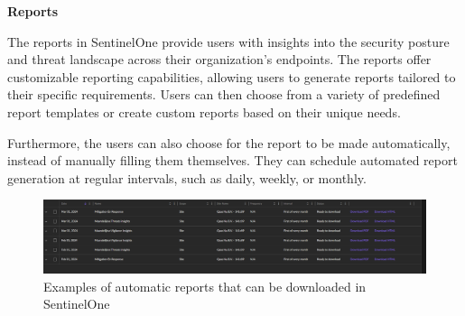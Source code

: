 \begin{multicols}{2}
      \textbf{Reports}

      The reports in SentinelOne provide users with insights into the security posture and threat landscape across their organization's
      endpoints. The reports offer customizable reporting capabilities, allowing users to generate reports tailored to their specific
      requirements. Users can then choose from a variety of predefined report templates or create custom reports based on their unique
      needs.

      Furthermore, the users can also choose for the report to be made automatically, instead of manually filling them themselves. They can
      schedule automated report generation at regular intervals, such as daily, weekly, or monthly.
\end{multicols}

\begin{figure}[htbp]
      \centering
      \includegraphics[width=1.0\textwidth]{Figures/SentinelOne/Reports.png}
      \caption{Examples of automatic reports that can be downloaded in SentinelOne}
      \label{fig:Reports}
\end{figure}


